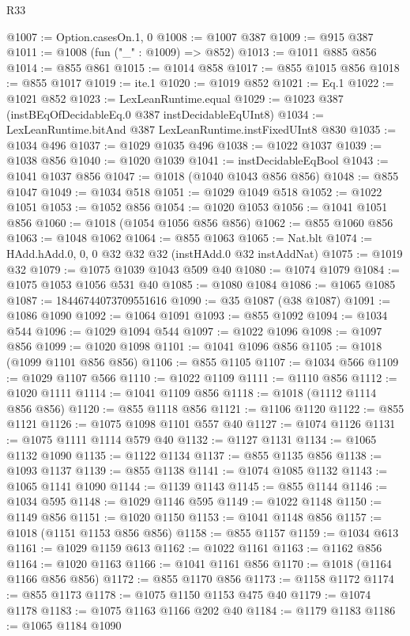 \begin{lexlean}{R33}
\begin{coremodule}
@1007 := Option.casesOn.{1, 0}
@1008 := @1007 @387
@1009 := @915 @387
@1011 := @1008 (fun ("_" : @1009) => @852)
@1013 := @1011 @885 @856
@1014 := @855 @861
@1015 := @1014 @858
@1017 := @855 @1015 @856
@1018 := @855 @1017
@1019 := ite.{1}
@1020 := @1019 @852
@1021 := Eq.{1}
@1022 := @1021 @852
@1023 := LexLeanRuntime.equal
@1029 := @1023 @387 (instBEqOfDecidableEq.{0} @387 instDecidableEqUInt8)
@1034 := LexLeanRuntime.bitAnd @387 LexLeanRuntime.instFixedUInt8 @830
@1035 := @1034 @496
@1037 := @1029 @1035 @496
@1038 := @1022 @1037
@1039 := @1038 @856
@1040 := @1020 @1039
@1041 := instDecidableEqBool
@1043 := @1041 @1037 @856
@1047 := @1018 (@1040 @1043 @856 @856)
@1048 := @855 @1047
@1049 := @1034 @518
@1051 := @1029 @1049 @518
@1052 := @1022 @1051
@1053 := @1052 @856
@1054 := @1020 @1053
@1056 := @1041 @1051 @856
@1060 := @1018 (@1054 @1056 @856 @856)
@1062 := @855 @1060 @856
@1063 := @1048 @1062
@1064 := @855 @1063
@1065 := Nat.blt
@1074 := HAdd.hAdd.{0, 0, 0} @32 @32 @32 (instHAdd.{0} @32 instAddNat)
@1075 := @1019 @32
@1079 := @1075 @1039 @1043 @509 @40
@1080 := @1074 @1079
@1084 := @1075 @1053 @1056 @531 @40
@1085 := @1080 @1084
@1086 := @1065 @1085
@1087 := 18446744073709551616
@1090 := @35 @1087 (@38 @1087)
@1091 := @1086 @1090
@1092 := @1064 @1091
@1093 := @855 @1092
@1094 := @1034 @544
@1096 := @1029 @1094 @544
@1097 := @1022 @1096
@1098 := @1097 @856
@1099 := @1020 @1098
@1101 := @1041 @1096 @856
@1105 := @1018 (@1099 @1101 @856 @856)
@1106 := @855 @1105
@1107 := @1034 @566
@1109 := @1029 @1107 @566
@1110 := @1022 @1109
@1111 := @1110 @856
@1112 := @1020 @1111
@1114 := @1041 @1109 @856
@1118 := @1018 (@1112 @1114 @856 @856)
@1120 := @855 @1118 @856
@1121 := @1106 @1120
@1122 := @855 @1121
@1126 := @1075 @1098 @1101 @557 @40
@1127 := @1074 @1126
@1131 := @1075 @1111 @1114 @579 @40
@1132 := @1127 @1131
@1134 := @1065 @1132 @1090
@1135 := @1122 @1134
@1137 := @855 @1135 @856
@1138 := @1093 @1137
@1139 := @855 @1138
@1141 := @1074 @1085 @1132
@1143 := @1065 @1141 @1090
@1144 := @1139 @1143
@1145 := @855 @1144
@1146 := @1034 @595
@1148 := @1029 @1146 @595
@1149 := @1022 @1148
@1150 := @1149 @856
@1151 := @1020 @1150
@1153 := @1041 @1148 @856
@1157 := @1018 (@1151 @1153 @856 @856)
@1158 := @855 @1157
@1159 := @1034 @613
@1161 := @1029 @1159 @613
@1162 := @1022 @1161
@1163 := @1162 @856
@1164 := @1020 @1163
@1166 := @1041 @1161 @856
@1170 := @1018 (@1164 @1166 @856 @856)
@1172 := @855 @1170 @856
@1173 := @1158 @1172
@1174 := @855 @1173
@1178 := @1075 @1150 @1153 @475 @40
@1179 := @1074 @1178
@1183 := @1075 @1163 @1166 @202 @40
@1184 := @1179 @1183
@1186 := @1065 @1184 @1090

\end{coremodule}
\end{lexlean}
